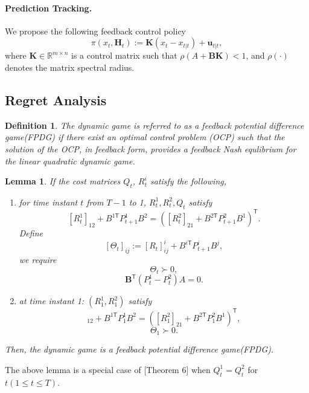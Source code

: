 \documentclass{article}
\newcommand{\transpose}{\mathsf{T}}
\newtheorem{lemma}{Lemma}
\newtheorem{definition}{Definition}
\begin{document}
\paragraph{Prediction Tracking. } We propose the following feedback control policy
\begin{equation}
    \pi(x_{t},\mathbf{H}_{t}) := \mathbf{K}(x_{t}-x_{t|t}) + \mathbf{u}_{t|t},
\end{equation}
where $\mathbf{K}\in \mathbb{R}^{m\times n}$ is a control matrix such that $\rho(A+\mathbf{B}\mathbf{K}) < 1$, and $\rho(\cdot)$ denotes the matrix spectral radius.


\subsection{Regret Analysis}

\begin{definition}
    The dynamic game is referred to as a feedback potential difference game(FPDG) if there exist an optimal control problem (OCP) such that the solution of the OCP, in feedback form, provides a feedback Nash equlibrium for the linear quadratic dynamic game. 
\end{definition}

\begin{lemma}
    If the cost matrices $Q_{t}$, $R_{t}^{i}$ satisfy the following,
    \begin{enumerate}
        \item for time instant $t$ from $T-1$ to 1, $R_{t}^{1},R_{t}^{2},Q_{t}$ satisfy
        \begin{equation}\label{eq:costFPDG1}
            [R_{t}^{1}]_{12} + B^{1\transpose}P_{t+1}^{1}B^{2} = ([R_{t}^{2}]_{21} + B^{2\transpose}P_{t+1}^{2}B^{1})^{\transpose}.
        \end{equation}
        Define
        \begin{equation}\label{eq:Theta}
        [\Theta_{t}]_{ij} := [R_{t}]^{i}_{ij} + B^{i\transpose}P_{t+1}^{i}B^{j},
        \end{equation}
        we require
        \begin{equation}
            \Theta_{t} \succ 0,
        \end{equation}
        \begin{equation*}
            \mathbf{B}^{\transpose}(P_{t}^{1}-P_{t}^{2})A=0.
        \end{equation*}
        \item at time instant 1: $(R_{1}^{1},R_{1}^{2})$ satisfy
        \begin{equation}
            [R_{1}^{1}]_{12} + B^{1\transpose}P_{1}^{1}B^{2} = ([R_{1}^{2}]_{21} + B^{2\transpose}P_{1}^{2}B^{1})^{\transpose},
        \end{equation}
        \begin{equation}\label{eq:costFPDG2}
            \Theta_{1} \succ 0.
        \end{equation}
    \end{enumerate}
    Then, the dynamic game is a feedback potential difference game(FPDG).
\end{lemma}
The above lemma is a special case of \cite{prasad_structure_2023}[Theorem 6] when $Q_{t}^{1}=Q_{t}^{2}$ for $t(1\leq t \leq T)$.
\end{document}

